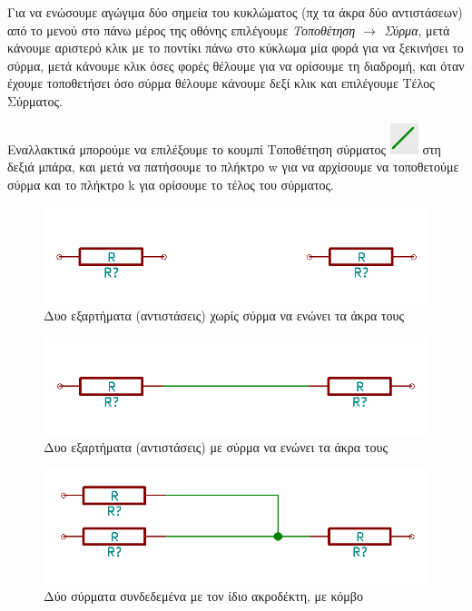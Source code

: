 \documentclass[a4paper]{article}
\begin{document}
Για να ενώσουμε αγώγιμα δύο σημεία του κυκλώματος (πχ τα άκρα δύο αντιστάσεων) από το μενού στο πάνω μέρος της οθόνης επιλέγουμε \textit{Τοποθέτηση $\rightarrow$ Σύρμα}, μετά κάνουμε αριστερό κλικ με το ποντίκι πάνω στο κύκλωμα μία φορά για να ξεκινήσει το σύρμα, μετά κάνουμε κλικ όσες φορές θέλουμε για να ορίσουμε τη διαδρομή, και όταν έχουμε τοποθετήσει όσο σύρμα θέλουμε κάνουμε δεξί κλικ και επιλέγουμε Τέλος Σύρματος. 

Εναλλακτικά μπορούμε να επιλέξουμε το κουμπί Τοποθέτηση σύρματος \includegraphics[scale=.5]{img/eesch-ico-wire.png} στη δεξιά μπάρα, και μετά να πατήσουμε το πλήκτρο w για να αρχίσουμε να τοποθετούμε σύρμα και το πλήκτρο k για ορίσουμε το τέλος του σύρματος.

\begin{figure}
  \begin{center}
    \includegraphics[width=.35\textwidth]{img/eesch-circ-twonotconn.png}
    \caption{Δυο εξαρτήματα (αντιστάσεις) χωρίς σύρμα να ενώνει τα άκρα τους}
    \label{fig:eesch-circ-twonotconn}
  \end{center}
\end{figure}

\begin{figure}
  \begin{center}
    \includegraphics[width=.35\textwidth]{img/eesch-circ-twoconn.png}
    \caption{Δυο εξαρτήματα (αντιστάσεις) με σύρμα να ενώνει τα άκρα τους}
    \label{fig:eesch-circ-twoconn}
  \end{center}
\end{figure}
   
\begin{figure}
  \begin{center}
    \includegraphics[width=.35\textwidth]{img/eesch-circ-threeconn.png}
    \caption{Δύο σύρματα συνδεδεμένα με τον ίδιο ακροδέκτη, με κόμβο}
    \label{fig:eesch-circ-threeconn}
  \end{center}
\end{figure}
\end{document}
